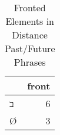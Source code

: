 \begin{table}[htbp!]
\centering
\caption{Fronted Elements in Distance Past/Future Phrases}
\label{table:dist_front}
\begin{tabular}{lr}
\toprule
{} &  front \\
\midrule
\texthebrew{ב} &      6 \\
Ø              &      3 \\
\bottomrule
\end{tabular}
\end{table}

